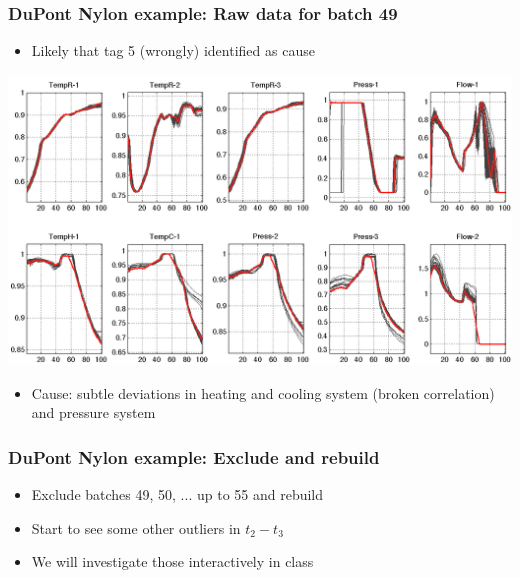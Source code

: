 \begin{frame}\frametitle{DuPont Nylon example: Raw data for batch 49}

	\begin{itemize}
		\item	Likely that tag 5 (wrongly) identified as cause
	\end{itemize}
	\begin{center}
		\includegraphics[width=\textwidth]{images/dupont/dupont-highlight-raw-data-batch-49.png}
	\end{center}
	
	\begin{itemize}
		\item	Cause: subtle deviations in heating and cooling system (broken correlation) and pressure system
	\end{itemize}
\end{frame}

\begin{frame}\frametitle{DuPont Nylon example: Exclude and rebuild}

	\begin{itemize}
		\item	Exclude batches 49, 50, ... up to 55 and rebuild
		
		\item	Start to see some other outliers in \( t_2 - t_3 \) 

		\item	We will investigate those interactively in class
	\end{itemize}
	
	
\end{frame}


